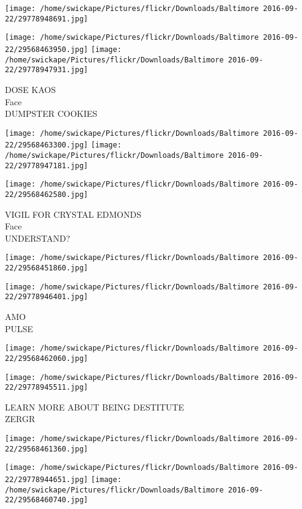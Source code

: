 \documentclass[10pt,letterpaper]{article}
\begin{document}
\texttt{[image: /home/swickape/Pictures/flickr/Downloads/Baltimore 2016-09-22/29778948691.jpg]}

\vspace{0.25in}
\texttt{[image: /home/swickape/Pictures/flickr/Downloads/Baltimore 2016-09-22/29568463950.jpg]}
\texttt{[image: /home/swickape/Pictures/flickr/Downloads/Baltimore 2016-09-22/29778947931.jpg]}

DOSE KAOS\\
Face\\
DUMPSTER COOKIES
\pagebreak

\texttt{[image: /home/swickape/Pictures/flickr/Downloads/Baltimore 2016-09-22/29568463300.jpg]}
\texttt{[image: /home/swickape/Pictures/flickr/Downloads/Baltimore 2016-09-22/29778947181.jpg]}

\vspace{0.25in}
\texttt{[image: /home/swickape/Pictures/flickr/Downloads/Baltimore 2016-09-22/29568462580.jpg]}

VIGIL FOR CRYSTAL EDMONDS\\
Face\\
UNDERSTAND?
\pagebreak

\texttt{[image: /home/swickape/Pictures/flickr/Downloads/Baltimore 2016-09-22/29568451860.jpg]}

\vspace{0.25in}
\texttt{[image: /home/swickape/Pictures/flickr/Downloads/Baltimore 2016-09-22/29778946401.jpg]}

AMO\\
PULSE
\pagebreak

\texttt{[image: /home/swickape/Pictures/flickr/Downloads/Baltimore 2016-09-22/29568462060.jpg]}

\vspace{0.25in}
\texttt{[image: /home/swickape/Pictures/flickr/Downloads/Baltimore 2016-09-22/29778945511.jpg]}

LEARN MORE ABOUT BEING DESTITUTE\\
ZERGR
\pagebreak

\texttt{[image: /home/swickape/Pictures/flickr/Downloads/Baltimore 2016-09-22/29568461360.jpg]}

\vspace{0.25in}
\texttt{[image: /home/swickape/Pictures/flickr/Downloads/Baltimore 2016-09-22/29778944651.jpg]}
\texttt{[image: /home/swickape/Pictures/flickr/Downloads/Baltimore 2016-09-22/29568460740.jpg]}
\end{document}
